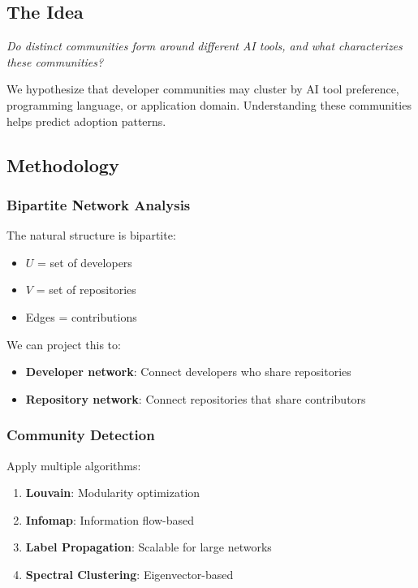 \documentclass[11pt,letterpaper]{article}
\begin{document}
\subsection{The Idea}

\begin{tcolorbox}[colback=yellow!5,colframe=yellow!75!black,title=Core Question]
\textit{Do distinct communities form around different AI tools, and what characterizes these communities?}
\end{tcolorbox}

We hypothesize that developer communities may cluster by AI tool preference, programming language, or application domain. Understanding these communities helps predict adoption patterns.

\subsection{Methodology}

\subsubsection{Bipartite Network Analysis}

The natural structure is bipartite:
\begin{itemize}
    \item $U$ = set of developers
    \item $V$ = set of repositories
    \item Edges = contributions
\end{itemize}

We can project this to:
\begin{itemize}
    \item \textbf{Developer network}: Connect developers who share repositories
    \item \textbf{Repository network}: Connect repositories that share contributors
\end{itemize}

\subsubsection{Community Detection}

Apply multiple algorithms:
\begin{enumerate}
    \item \textbf{Louvain}: Modularity optimization
    \item \textbf{Infomap}: Information flow-based
    \item \textbf{Label Propagation}: Scalable for large networks
    \item \textbf{Spectral Clustering}: Eigenvector-based
\end{enumerate}
\end{document}
